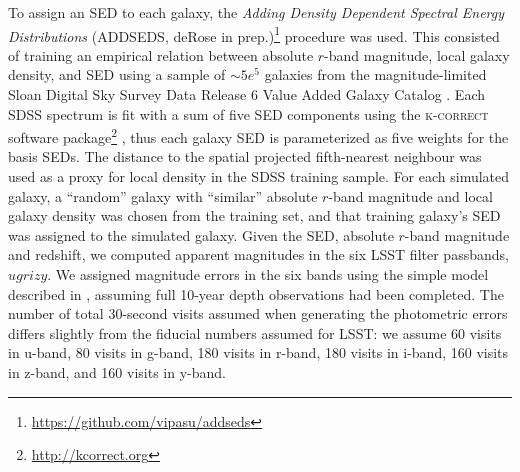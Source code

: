 To assign an SED to each galaxy, the {\it Adding Density Dependent Spectral Energy Distributions} (\textsc{ADDSEDS}, deRose in prep.)\footnote{\url{https://github.com/vipasu/addseds}} procedure was used. This consisted of training an empirical relation between absolute $r$-band magnitude, local galaxy density, and SED using a sample of $\sim 5e^{5}$ galaxies from the magnitude-limited Sloan Digital Sky Survey Data Release 6 Value Added Galaxy Catalog \citep{Blanton:05}. Each SDSS spectrum is fit with a sum of five SED components using the \textsc{k-correct } software package\footnote{\url{http://kcorrect.org}} \citep{Blanton:07}, thus each galaxy SED is parameterized as five weights for the basis SEDs. The distance to the spatial projected fifth-nearest neighbour was used as a proxy for local density in the SDSS training sample. For each simulated galaxy, a ``random'' \red{[details]} galaxy with ``similar'' \red{[details]} absolute $r$-band magnitude and local galaxy density was chosen from the training set, and that training galaxy's SED was assigned to the simulated galaxy. Given the SED, absolute $r$-band magnitude and redshift, we computed apparent magnitudes in the six LSST filter passbands, $ugrizy$. We assigned magnitude errors in the six bands using the simple model described in \citet{Ivezic:08}, assuming full 10-year depth observations had been completed.  The number of total 30-second visits assumed when generating the photometric errors differs slightly from the fiducial numbers assumed for LSST: we assume 60 visits in u-band, 80 visits in g-band, 180 visits in r-band, 180 visits in i-band, 160 visits in z-band, and 160 visits in y-band.

